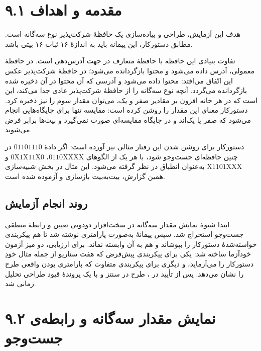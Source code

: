 \documentclass[12pt,a4paper]{article}
\begin{document}

	\section*{۹.۱ مقدمه و اهداف}
	هدف این آزمایش، طراحی و پیاده‌سازی یک حافظهٔ شرکت‌پذیر نوع سه‌گانه است. مطابق دستورکار، این پیمانه باید به اندازهٔ ۱۶ ثبات ۱۶ بیتی باشد.

	تفاوت بنیادی این حافظه با حافظهٔ متعارف در جهت آدرس‌دهی است. در حافظهٔ معمولی، آدرس داده می‌شود و محتوا بازگردانده می‌شود؛ در حافظهٔ شرکت‌پذیر عکس این اتّفاق می‌افتد: محتوا داده می‌شود و آدرسی که آن محتوا در آن ذخیره شده بازگردانده می‌گردد. آنچه نوع سه‌گانه را از حافظهٔ شرکت‌پذیر عادی جدا می‌کند، این است که در هر خانه افزون بر مقادیر صفر و یک، می‌توان مقدار سوم  را نیز ذخیره کرد. دستورکار معنای این مقدار را روشن کرده است: مقایسه تنها برای جایگاه‌هایی انجام می‌شود که صفر یا یک‌اند و در جایگاه  مقایسه‌ای صورت نمی‌گیرد و بیت‌ها برابر فرض می‌شوند.

	دستورکار برای روشن شدن این رفتار مثالی نیز آورده است: اگر دادهٔ \(01101110\) در چنین حافظه‌ای جست‌وجو شود، با هر یک از الگوهای \(0110\mathrm{XXXX}\)، \(0\mathrm{X}1\mathrm{X}11\mathrm{X}0\) و \(\mathrm{X}1101\mathrm{XXX}\) به‌عنوان انطباق در نظر گرفته می‌شود. این مثال در بخش شبیه‌سازی همین گزارش، بیت‌به‌بیت بازسازی و آزموده شده است.

	\subsection*{روند انجام آزمایش}
	ابتدا شیوهٔ نمایش مقدار سه‌گانه در سخت‌افزار دودویی تعیین و رابطهٔ منطقی جست‌وجو استخراج شد. سپس پیمانهٔ  به‌صورت پارامتری نوشته شد تا هم پیکربندی خواسته‌شدهٔ دستورکار را بپوشاند و هم به آن وابسته نماند. برای ارزیابی، دو میز آزمون خودآزما ساخته شد: یکی برای پیکربندی پیش‌فرض که هفت سناریو از جمله مثال خودِ دستورکار را می‌آزماید، و دیگری برای پیکربندی متفاوت که پارامتری بودن واقعی طرح را نشان می‌دهد. پس از تأیید در ، طرح در  سنتز و با یک پروندهٔ قیود طراحی تحلیل زمانی شد.

	\section*{۹.۲ نمایش مقدار سه‌گانه و رابطه‌ی جست‌وجو}
\end{document}
